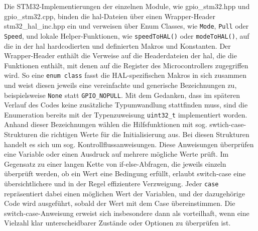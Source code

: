 Die STM32-Implementierungen der einzelnen Module, wie gpio\_stm32.hpp und gpio\_stm32.cpp, binden die \gls{hal}-Dateien über einen Wrapper-Header stm32\_hal\_inc.hpp ein und verweisen über Enum Classes, wie \texttt{Mode}, \texttt{Pull} oder \texttt{Speed}, und lokale Helper-Funktionen, wie \texttt{speedToHAL()} oder \texttt{modeToHAL()}, auf die in der \gls{hal} hardcodierten und definierten Makros und Konstanten.
Der Wrapper-Header enthält die Verweise auf die Headerdateien der \gls{hal}, die die Funktionen enthält, mit denen auf die Register des Microcontrollers zugegriffen wird.
So eine \texttt{enum class} fasst die HAL-spezifischen Makros in sich zusammen und weist diesen jeweils eine vereinfachte und generische Bezeichnungen zu, beispielsweise \texttt{None} statt \texttt{GPIO\_NOPULL}.
Mit dem Gedanken, dass im späteren Verlauf des Codes keine zusätzliche Typumwandlung stattfinden muss, sind die Enumeration bereits mit der Typenzuweisung \texttt{uint32\_t} implementiert worden.
Anhand dieser Bezeichnungen wählen die Hilfsfunktionen mit sog. swtich-case-Strukturen die richtigen Werte für die Initialisierung aus.
Bei diesen Strukturen handelt es sich um sog. Kontrollflussanweisungen.
Diese Anweisungen überprüfen eine Variable oder einen Ausdruck auf mehrere mögliche Werte prüft.
Im Gegensatz zu einer langen Kette von if-else-Abfragen, die jeweils einzeln überprüft werden, ob ein Wert eine Bedingung erfüllt, erlaubt switch-case eine übersichtlichere und in der Regel effizientere Verzweigung.
Jeder \texttt{case} repräsentiert dabei einen möglichen Wert der Variablen, und der dazugehörige Code wird ausgeführt, sobald der Wert mit dem Case übereinstimmen.
Die switch-case-Anweisung erweist sich insbesondere dann als vorteilhaft, wenn eine Vielzahl klar unterscheidbarer Zustände oder Optionen zu überprüfen ist. 

